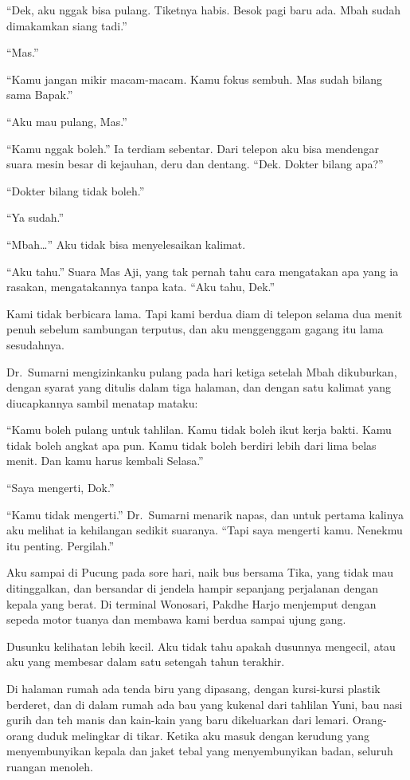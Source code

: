 \documentclass[11pt,twoside,openany]{book}
\makeatletter
\newcommand{\scenebreak}{\par\vspace{0.9em}{\centering\textsc{*\hspace{0.7em}*\hspace{0.7em}*}\par}\vspace{0.9em}\@afterindentfalse\@afterheading}
\makeatother
\begin{document}
``Dek, aku nggak bisa pulang. Tiketnya habis. Besok pagi baru ada. Mbah sudah dimakamkan siang tadi.''

``Mas.''

``Kamu jangan mikir macam-macam. Kamu fokus sembuh. Mas sudah bilang sama Bapak.''

``Aku mau pulang, Mas.''

``Kamu nggak boleh.'' Ia terdiam sebentar. Dari telepon aku bisa mendengar suara mesin besar di kejauhan, deru dan dentang. ``Dek. Dokter bilang apa?''

``Dokter bilang tidak boleh.''

``Ya sudah.''

``Mbah\ldots{}'' Aku tidak bisa menyelesaikan kalimat.

``Aku tahu.'' Suara Mas Aji, yang tak pernah tahu cara mengatakan apa yang ia rasakan, mengatakannya tanpa kata. ``Aku tahu, Dek.''

Kami tidak berbicara lama. Tapi kami berdua diam di telepon selama dua menit penuh sebelum sambungan terputus, dan aku menggenggam gagang itu lama sesudahnya.

\scenebreak
Dr.~Sumarni mengizinkanku pulang pada hari ketiga setelah Mbah dikuburkan, dengan syarat yang ditulis dalam tiga halaman, dan dengan satu kalimat yang diucapkannya sambil menatap mataku:

``Kamu boleh pulang untuk tahlilan. Kamu tidak boleh ikut kerja bakti. Kamu tidak boleh angkat apa pun. Kamu tidak boleh berdiri lebih dari lima belas menit. Dan kamu harus kembali Selasa.''

``Saya mengerti, Dok.''

``Kamu tidak mengerti.'' Dr.~Sumarni menarik napas, dan untuk pertama kalinya aku melihat ia kehilangan sedikit suaranya. ``Tapi saya mengerti kamu. Nenekmu itu penting. Pergilah.''

Aku sampai di Pucung pada sore hari, naik bus bersama Tika, yang tidak mau ditinggalkan, dan bersandar di jendela hampir sepanjang perjalanan dengan kepala yang berat. Di terminal Wonosari, Pakdhe Harjo menjemput dengan sepeda motor tuanya dan membawa kami berdua sampai ujung gang.

Dusunku kelihatan lebih kecil. Aku tidak tahu apakah dusunnya mengecil, atau aku yang membesar dalam satu setengah tahun terakhir.

Di halaman rumah ada tenda biru yang dipasang, dengan kursi-kursi plastik berderet, dan di dalam rumah ada bau yang kukenal dari tahlilan Yuni, bau nasi gurih dan teh manis dan kain-kain yang baru dikeluarkan dari lemari. Orang-orang duduk melingkar di tikar. Ketika aku masuk dengan kerudung yang menyembunyikan kepala dan jaket tebal yang menyembunyikan badan, seluruh ruangan menoleh.
\end{document}

